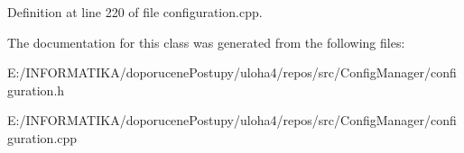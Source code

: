Definition at line 220 of file configuration.\+cpp.



The documentation for this class was generated from the following files\+:\begin{DoxyCompactItemize}
\item 
E\+:/\+I\+N\+F\+O\+R\+M\+A\+T\+I\+K\+A/doporucene\+Postupy/uloha4/repos/src/\+Config\+Manager/configuration.\+h\item 
E\+:/\+I\+N\+F\+O\+R\+M\+A\+T\+I\+K\+A/doporucene\+Postupy/uloha4/repos/src/\+Config\+Manager/configuration.\+cpp\end{DoxyCompactItemize}
